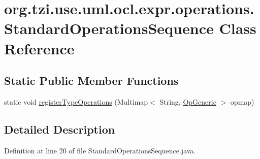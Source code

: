 \hypertarget{classorg_1_1tzi_1_1use_1_1uml_1_1ocl_1_1expr_1_1operations_1_1_standard_operations_sequence}{\section{org.\-tzi.\-use.\-uml.\-ocl.\-expr.\-operations.\-Standard\-Operations\-Sequence Class Reference}
\label{classorg_1_1tzi_1_1use_1_1uml_1_1ocl_1_1expr_1_1operations_1_1_standard_operations_sequence}
}
\subsection*{Static Public Member Functions}
\begin{DoxyCompactItemize}
\item 
static void \hyperlink{classorg_1_1tzi_1_1use_1_1uml_1_1ocl_1_1expr_1_1operations_1_1_standard_operations_sequence_a18a80743089f996a89e979b2835a1315}{register\-Type\-Operations} (Multimap$<$ String, \hyperlink{classorg_1_1tzi_1_1use_1_1uml_1_1ocl_1_1expr_1_1operations_1_1_op_generic}{Op\-Generic} $>$ opmap)
\end{DoxyCompactItemize}


\subsection{Detailed Description}


Definition at line 20 of file Standard\-Operations\-Sequence.\-java.



